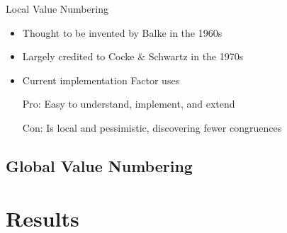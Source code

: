 \documentclass{beamer}
\begin{document}
\begin{frame}{Local Value Numbering}
  \begin{itemize}
    \item Thought to be invented by Balke in the 1960s
    \item Largely credited to Cocke \& Schwartz in the 1970s
    \item Current implementation Factor uses
  \end{itemize}

  \begin{itemize}
    \item[Pro:] Easy to understand, implement, and extend

    \item[Con:] Is \alert{local} and \alert{pessimistic}, discovering fewer
    congruences
  \end{itemize}
\end{frame}

\subsection{Global Value Numbering}

\section{Results}
\end{document}
